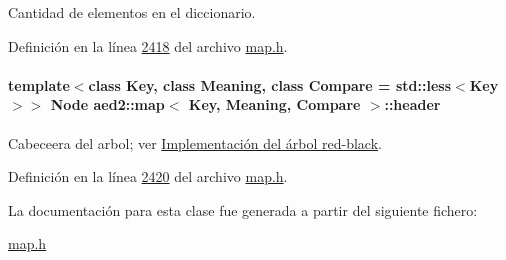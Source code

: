 Cantidad de elementos en el diccionario. 



Definición en la línea \hyperlink{map_8h_source_l02418}{2418} del archivo \hyperlink{map_8h_source}{map.\+h}.

\paragraph[{\texorpdfstring{header}{header}}]{\setlength{\rightskip}{0pt plus 5cm}template$<$class Key, class Meaning, class Compare = std\+::less$<$\+Key$>$$>$ {\bf Node} {\bf aed2\+::map}$<$ Key, Meaning, Compare $>$\+::header\hspace{0.3cm}{\ttfamily [private]}}\hypertarget{classaed2_1_1map_a92d93f905c8ad73fba18fdc7e8915cce_a92d93f905c8ad73fba18fdc7e8915cce}{}\label{classaed2_1_1map_a92d93f905c8ad73fba18fdc7e8915cce_a92d93f905c8ad73fba18fdc7e8915cce}


Cabeceera del arbol; ver \hyperlink{Implementacion}{Implementación del árbol red-\/black}. 



Definición en la línea \hyperlink{map_8h_source_l02420}{2420} del archivo \hyperlink{map_8h_source}{map.\+h}.



La documentación para esta clase fue generada a partir del siguiente fichero\+:\begin{DoxyCompactItemize}
\item 
\hyperlink{map_8h}{map.\+h}\end{DoxyCompactItemize}
